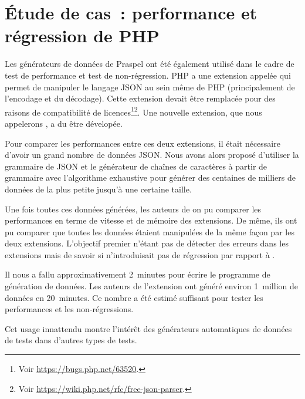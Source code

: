 \section{Étude de cas~: performance et régression de PHP}
\label{section:experimentation:php}

Les générateurs de données de Praspel ont été également utilisé dans le cadre de
test de performance et test de non-régression. PHP a une extension appelée
 qui permet de manipuler le langage JSON au sein même de PHP
(principalement de l'encodage et du décodage). Cette extension devait être
remplacée pour des raisons de compatibilité de licences\footnote{Voir
\url{https://bugs.php.net/63520}.}\footnote{Voir
\url{https://wiki.php.net/rfc/free-json-parser}.}. Une nouvelle extension, que
nous appelerons , a du être dévelopée.

Pour comparer les performances entre ces deux extensions, il était nécessaire
d'avoir un grand nombre de données JSON. Nous avons alors proposé d'utiliser la
grammaire de JSON et le générateur de chaînes de caractères à partir de
grammaire avec l'algorithme exhaustive pour générer des centaines de milliers de
données de la plus petite jusqu'à une certaine taille.

Une fois toutes ces données générées, les auteurs de  on pu
comparer les performances en terme de vitesse et de mémoire des extensions. De
même, ils ont pu comparer que toutes les données étaient manipulées de la même
façon par les deux extensions. L'objectif premier n'étant pas de détecter des
erreurs dans les extensions mais de savoir si  n'introduisait
pas de régression par rapport à .

Il nous a fallu approximativement 2~minutes pour écrire le programme de
génération de données. Les auteurs de l'extension ont généré environ 1~million
de données en 20~minutes. Ce nombre a été estimé suffisant pour tester les
performances et les non-régressions.

Cet usage innattendu montre l'intérêt des générateurs automatiques de données de
tests dans d'autres types de tests.
